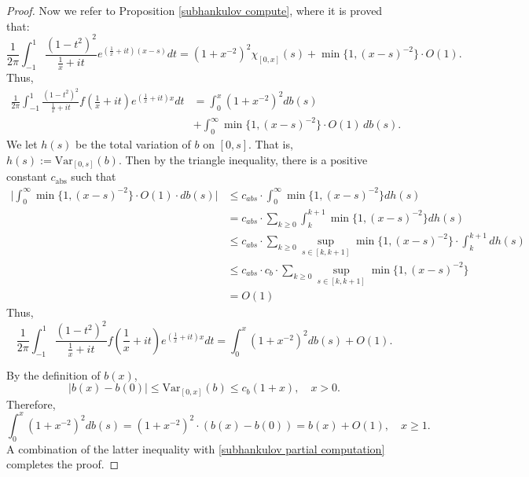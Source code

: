 \begin{proof}
        Now we refer to Proposition \ref{subhankulov compute}, where it is proved that:
        $$\frac1{2\pi}\int_{-1}^1\frac{(1-t^2)^2}{\frac1x+it}e^{(\frac1x+it)(x-s)}dt=(1+x^{-2})^2\chi_{[0,x]}(s)+\min\{1,(x-s)^{-2}\}\cdot O(1).$$
        Thus,
        \begin{align*}
            \frac1{2\pi}\int_{-1}^1\frac{(1-t^2)^2}{\frac1x+it}f(\frac1x+it)e^{(\frac1x+it)x}dt &= \int_0^x(1+x^{-2})^2db(s)\\
                                                                                                &+ \int_0^{\infty}\min\{1,(x-s)^{-2}\}\cdot O(1)\,db(s).
        \end{align*}
        We let $h(s)$ be the total variation of $b$ on $[0,s]$. That is, $h(s) := \mathrm{Var}_{[0,s]}(b)$. Then by the triangle inequality, there is a positive constant $c_{\mathrm{abs}}$ such that
        \begin{align*}
            \Big|\int_0^{\infty}\min\{1,(x-s)^{-2}\}\cdot O(1)\cdot db(s)\Big|
                            &\leq c_{abs}\cdot \int_0^{\infty}\min\{1,(x-s)^{-2}\}dh(s)\\
                            &=c_{abs}\cdot\sum_{k\geq0}\int_k^{k+1}\min\{1,(x-s)^{-2}\}dh(s)\\   
                            &\leq c_{abs}\cdot\sum_{k\geq0}\sup_{s\in[k,k+1]}\min\{1,(x-s)^{-2}\}\cdot\int_k^{k+1}dh(s)\\
                            &\leq c_{abs}\cdot c_b\cdot\sum_{k\geq0}\sup_{s\in[k,k+1]}\min\{1,(x-s)^{-2}\}\\
                            &= O(1)
        \end{align*}
        Thus,
        \begin{equation}\label{subhankulov partial computation}
            \frac1{2\pi}\int_{-1}^1\frac{(1-t^2)^2}{\frac1x+it}f(\frac1x+it)e^{(\frac1x+it)x}dt=\int_0^x(1+x^{-2})^2db(s)+O(1).
        \end{equation}
        
        By the definition of $b(x)$,
        $$|b(x)-b(0)|\leq\mathrm{Var}_{[0,x]}(b)\leq c_b(1+x),\quad x > 0.$$
        Therefore,
        $$\int_0^x(1+x^{-2})^2db(s)=(1+x^{-2})^2\cdot (b(x)-b(0))=b(x)+O(1),\quad x\geq1.$$
        A combination of the latter inequality with \eqref{subhankulov partial computation} completes the proof.
    \end{proof}
    

